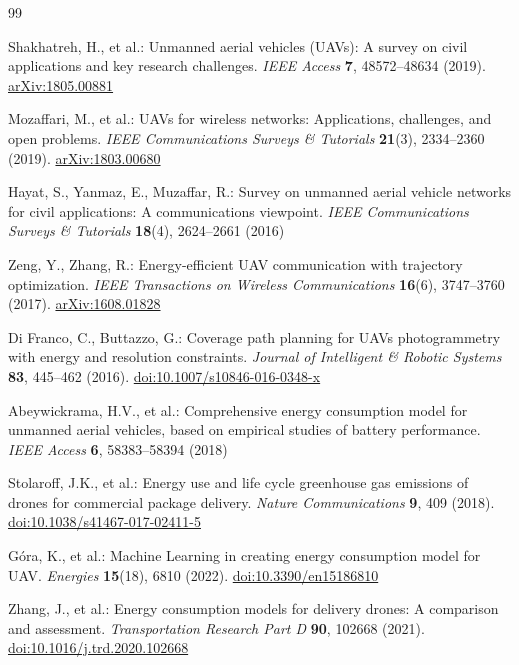 \documentclass[runningheads,a4paper]{llncs}
\begin{document}
\begin{thebibliography}{99}

Shakhatreh, H., et al.: Unmanned aerial vehicles (UAVs): A survey on civil applications and key research challenges. \textit{IEEE Access} \textbf{7}, 48572--48634 (2019). \href{https://arxiv.org/abs/1805.00881}{arXiv:1805.00881}

Mozaffari, M., et al.: UAVs for wireless networks: Applications, challenges, and open problems. \textit{IEEE Communications Surveys \& Tutorials} \textbf{21}(3), 2334--2360 (2019). \href{https://arxiv.org/abs/1803.00680}{arXiv:1803.00680}

Hayat, S., Yanmaz, E., Muzaffar, R.: Survey on unmanned aerial vehicle networks for civil applications: A communications viewpoint. \textit{IEEE Communications Surveys \& Tutorials} \textbf{18}(4), 2624--2661 (2016)

Zeng, Y., Zhang, R.: Energy-efficient UAV communication with trajectory optimization. \textit{IEEE Transactions on Wireless Communications} \textbf{16}(6), 3747--3760 (2017). \href{https://arxiv.org/abs/1608.01828}{arXiv:1608.01828}

Di Franco, C., Buttazzo, G.: Coverage path planning for UAVs photogrammetry with energy and resolution constraints. \textit{Journal of Intelligent \& Robotic Systems} \textbf{83}, 445--462 (2016). \href{https://doi.org/10.1007/s10846-016-0348-x}{doi:10.1007/s10846-016-0348-x}

Abeywickrama, H.V., et al.: Comprehensive energy consumption model for unmanned aerial vehicles, based on empirical studies of battery performance. \textit{IEEE Access} \textbf{6}, 58383--58394 (2018)

Stolaroff, J.K., et al.: Energy use and life cycle greenhouse gas emissions of drones for commercial package delivery. \textit{Nature Communications} \textbf{9}, 409 (2018). \href{https://doi.org/10.1038/s41467-017-02411-5}{doi:10.1038/s41467-017-02411-5}

G\'ora, K., et al.: Machine Learning in creating energy consumption model for UAV. \textit{Energies} \textbf{15}(18), 6810 (2022). \href{https://doi.org/10.3390/en15186810}{doi:10.3390/en15186810}

Zhang, J., et al.: Energy consumption models for delivery drones: A comparison and assessment. \textit{Transportation Research Part D} \textbf{90}, 102668 (2021). \href{https://doi.org/10.1016/j.trd.2020.102668}{doi:10.1016/j.trd.2020.102668}


\end{thebibliography}
\end{document}
